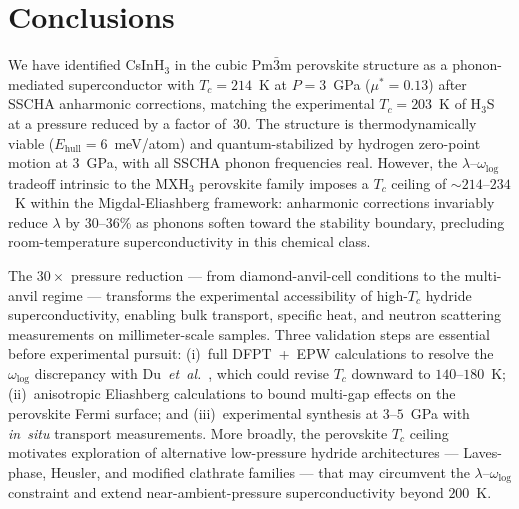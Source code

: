 \section{Conclusions}
\label{sec:conclusions}

We have identified CsInH$_3$ in the cubic Pm$\bar{3}$m perovskite
structure as a phonon-mediated superconductor with
$T_c = 214$~K at $P = 3$~GPa ($\mu^* = 0.13$) after SSCHA anharmonic
corrections, matching the experimental $T_c = 203$~K of
H$_3$S~\cite{Drozdov2015} at a pressure reduced by a factor of~$30$.
The structure is thermodynamically viable
($E_{\mathrm{hull}} = 6$~meV/atom) and quantum-stabilized by hydrogen
zero-point motion at $3$~GPa, with all SSCHA phonon frequencies real.
However, the $\lambda$--$\omega_{\mathrm{log}}$ tradeoff intrinsic to
the MXH$_3$ perovskite family imposes a $T_c$ ceiling of
$\sim 214$--$234$~K within the Migdal-Eliashberg framework: anharmonic
corrections invariably reduce $\lambda$ by $30$--$36\%$ as phonons
soften toward the stability boundary, precluding room-temperature
superconductivity in this chemical class.

The $30\times$ pressure reduction --- from diamond-anvil-cell conditions
to the multi-anvil regime --- transforms the experimental accessibility
of high-$T_c$ hydride superconductivity, enabling bulk transport,
specific heat, and neutron scattering measurements on millimeter-scale
samples. Three validation steps are essential before experimental
pursuit: (i)~full DFPT~+~EPW calculations to resolve the
$\omega_{\mathrm{log}}$ discrepancy with
Du~\textit{et~al.}~\cite{Du2024}, which could
revise $T_c$ downward to $140$--$180$~K; (ii)~anisotropic Eliashberg
calculations to bound multi-gap effects on the perovskite Fermi surface;
and (iii)~experimental synthesis at $3$--$5$~GPa with \textit{in~situ}
transport measurements. More broadly, the perovskite $T_c$ ceiling
motivates exploration of alternative low-pressure hydride architectures
--- Laves-phase, Heusler, and modified clathrate families --- that may
circumvent the $\lambda$--$\omega_{\mathrm{log}}$ constraint and extend
near-ambient-pressure superconductivity beyond $200$~K.

